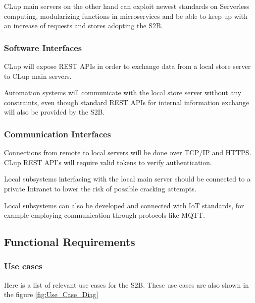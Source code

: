 CLup main servers on the other hand can exploit newest standards on Serverless computing, modularizing functions in microservices and be able to keep up with an increase of requests and stores adopting the S2B.
\vfill


\subsubsection{Software Interfaces}
CLup will expose REST APIs in order to exchange data from a local store server to CLup main servers.

Automation systems will communicate with the local store server without any constraints, even though standard REST APIs for internal information exchange will also be provided by the S2B.

\subsubsection{Communication Interfaces}

Connections from remote to local servers will be done over TCP/IP and HTTPS.
CLup REST API's will require valid tokens to verify authentication.

Local subsystems interfacing with the local main server should be connected to a private Intranet to lower the risk of possible cracking attempts.

Local subsystems can also be developed and connected with IoT standards, for example employing communication through protocols like MQTT.

\subsection{Functional Requirements}
\subsubsection{Use cases}
Here is a list of relevant use cases for the S2B. These use cases are also shown in the figure \ref{fig:Use_Case_Diag}
\smallskip

